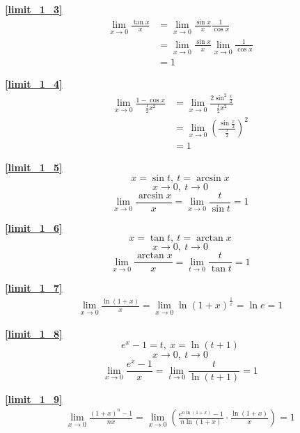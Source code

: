 \textbf{\large \ref{limit_1_3}}
\begin{align*}
        \lim\limits_{x\to 0}\frac{\tan x}{x}&=\lim\limits_{x\to 0}\frac{\sin x}{x}\frac{1}{\cos x}\\
        &=\lim\limits_{x\to 0}\frac{\sin x}{x}\lim\limits_{x\to 0}\frac{1}{\cos x}\\
        &=1
\end{align*}

\textbf{\large \ref{limit_1_4}}
\begin{align*}
        \lim\limits_{x\to 0}\frac{1-\cos x}{\frac{1}{2}x^2}&=\lim\limits_{x\to 0}\frac{2\sin^2\frac{x}{2}}{\frac{1}{2}x^2}\\
        &=\lim\limits_{x\to 0}\left(\frac{\sin \frac{x}{2}}{\frac{x}{2}}\right)^2\\
        &=1
\end{align*}

\textbf{\large \ref{limit_1_5}}
{
$$x=\sin t,\ t=\arcsin x$$
$$x\rightarrow 0,\ t\rightarrow 0$$
$$\lim\limits_{x\to 0}\frac{\arcsin x}{x}=\lim\limits_{x\to 0}\frac{t}{\sin t}=1$$
}

\textbf{\large \ref{limit_1_6}}
    {
    $$x=\tan t,\ t=\arctan x$$
    $$x\rightarrow 0,\ t\rightarrow 0$$
    $$\lim\limits_{x\to 0}\frac{\arctan x}{x}=\lim\limits_{t\to 0}\frac{t}{\tan t}=1$$
    }

\textbf{\large \ref{limit_1_7}}
\begin{align*}
        \lim\limits_{x\to 0}\frac{\ln \left(1+x\right)}{x}=\lim\limits_{x\to 0}\ln \left(1+x\right)^\frac{1}{x}=\ln e=1
\end{align*}

\textbf{\large \ref{limit_1_8}}
    $$e^x-1=t,\ x=\ln\left(t+1\right)$$
    $$x\rightarrow 0,\ t\rightarrow 0$$
    $$\lim\limits_{x\to 0}\frac{e^x-1}{x}=\lim\limits_{t\to 0}\frac{t}{\ln\left(t+1\right)}=1$$

\textbf{\large \ref{limit_1_9}}
\begin{align*}
        \lim\limits_{x\to 0}\frac{\left(1+x\right)^n-1}{nx}=\lim\limits_{x\to 0}\left(\frac{e^{n\ln \left(1+x\right)}-1}{n\ln\left(1+x\right)}\cdot\frac{\ln\left(1+x\right)}{x}\right)=1
\end{align*}

